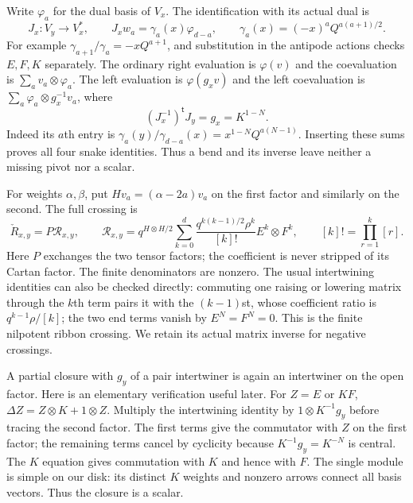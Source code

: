 \documentclass[11pt]{article}
\numberwithin{equation}{section}
\theoremstyle{definition}\newtheorem{definition}[theorem]{Definition}
\theoremstyle{remark}\newtheorem{remark}[theorem]{Remark}
\begin{document}
Write $\varphi_a$ for the dual basis of $V_x$. The identification
with its actual dual is
\begin{equation}\label{mt:duality}
 J_x:V_y\longrightarrow V_x^*,\qquad
 J_xw_a=\gamma_a(x)\varphi_{d-a},\qquad
 \gamma_a(x)=(-x)^aQ^{a(a+1)/2}.
\end{equation}
For example $\gamma_{a+1}/\gamma_a=-xQ^{a+1}$, and substitution
in the antipode actions checks $E,F,K$ separately. The ordinary
right evaluation is $\varphi(v)$ and the coevaluation is
$\sum_a v_a\otimes\varphi_a$. The left evaluation is
$\varphi(g_xv)$ and the left coevaluation is
$\sum_a\varphi_a\otimes g_x^{-1}v_a$, where
\begin{equation}\label{mt:pivot}
 (J_x^{-1})^{\mathsf t}J_y=g_x=K^{1-N}.
\end{equation}
Indeed its $a$th entry is
$\gamma_a(y)/\gamma_{d-a}(x)=x^{1-N}Q^{a(N-1)}$.
Inserting these sums proves all four snake identities. Thus a bend
and its inverse leave neither a missing pivot nor a scalar.

For weights $\alpha,\beta$, put $H v_a=(\alpha-2a)v_a$ on the
first factor and similarly on the second. The full crossing is
\begin{equation}\label{mt:braid}
 \check R_{x,y}=P\mathscr R_{x,y},\qquad
 \mathscr R_{x,y}=q^{H\otimes H/2}
 \sum_{k=0}^d\frac{q^{k(k-1)/2}\rho^k}{[k]!}E^k\otimes F^k,
 \qquad [k]!=\prod_{r=1}^k[r].
\end{equation}
Here $P$ exchanges the two tensor factors; the coefficient is never
stripped of its Cartan factor. The finite denominators are nonzero.
The usual intertwining identities can also be checked directly:
commuting one raising or lowering matrix through the $k$th term
pairs it with the $(k-1)$st, whose coefficient ratio is
$q^{k-1}\rho/[k]$; the two end terms vanish by $E^N=F^N=0$.
This is the finite nilpotent ribbon crossing. We retain its actual
matrix inverse for negative crossings.

A partial closure with $g_y$ of a pair intertwiner is again an
intertwiner on the open factor. Here is an elementary verification
useful later. For $Z=E$ or $KF$,
$\Delta Z=Z\otimes K+1\otimes Z$. Multiply the intertwining
identity by $1\otimes K^{-1}g_y$ before tracing the second factor.
The first terms give the commutator with $Z$ on the first factor;
the remaining terms cancel by cyclicity because
$K^{-1}g_y=K^{-N}$ is central. The $K$ equation gives commutation
with $K$ and hence with $F$. The single module is simple on our disk:
its distinct $K$ weights and nonzero arrows connect all basis vectors.
Thus the closure is a scalar.
\end{document}
